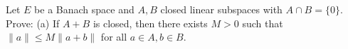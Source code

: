 Let $E$ be a Banach space and $A, B$ closed linear subspaces with $A \cap B = \{0\}$. Prove: (a) If $A + B$ is closed, then there exists $M > 0$ such that $\|a\| \leq M\|a+b\|$ for all $a \in A, b \in B$.
